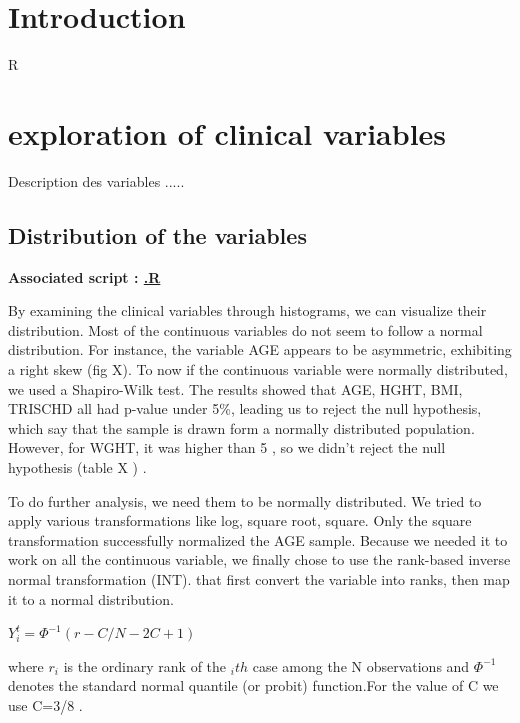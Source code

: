 \documentclass[a4paper, 11pt]{article}
\begin{document}
\begin{multicols}{2}

\section{Introduction}
R \citep{R:2024}

\section{exploration of  clinical variables}
Description des variables .....  

\subsection{Distribution of the variables }

\begin{scriptsize}	
	
	\textbf{Associated script : \href{https://github.com/leopoldguyot/BINF-F401-Project/*}{.R}}
\end{scriptsize}

By examining the clinical variables through histograms, we can visualize their distribution. Most of the continuous variables do not seem to follow a normal distribution. For instance, the variable AGE appears to be asymmetric, exhibiting a right skew (fig X).
To now if the continuous variable were normally distributed, we used a Shapiro-Wilk test. The results showed that AGE, HGHT, BMI, TRISCHD all had p-value under 5\%, leading us to reject the null hypothesis, which say that the sample is drawn form a normally distributed population. However, for WGHT, it was higher than 5 , so we didn’t reject the null hypothesis (table X ) . 

To do further analysis, we need them to be normally distributed. We tried to apply various transformations like log, square root, square. Only the square transformation successfully normalized the AGE sample. 
Because we needed it to work on all the continuous variable, we finally chose to use the rank-based inverse normal transformation (INT). that first convert the variable into ranks, then map it to a normal distribution. 

$ Y^t_{i}=  \Phi^{-1}(r-C/N-2C+1) $

where $r_i$ is the ordinary rank of the $_ith$ case among the N observations and $\Phi^{-1}$ denotes the standard normal quantile (or probit) function.For the value of C we use C=3/8 \citep{beasley2009rank}.


\end{multicols}
\end{document}
